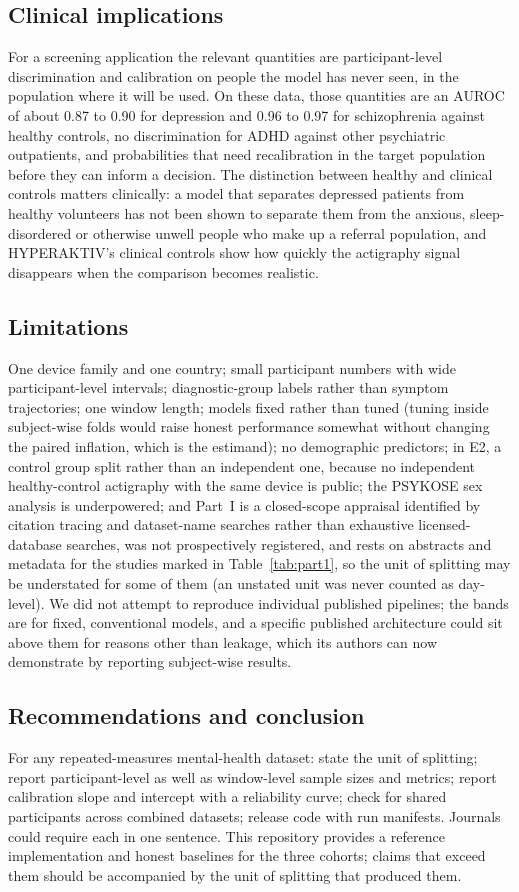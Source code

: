 \documentclass[11pt,a4paper]{article}
\begin{document}
\subsection{Clinical implications}
For a screening application the relevant quantities are participant-level discrimination and
calibration on people the model has never seen, in the population where it will be used. On
these data, those quantities are an AUROC of about 0.87 to 0.90 for depression and 0.96 to 0.97
for schizophrenia against healthy controls, no discrimination for ADHD against other psychiatric
outpatients, and probabilities that need recalibration in the target population before they can
inform a decision. The distinction between healthy and clinical controls matters clinically: a
model that separates depressed patients from healthy volunteers has not been shown to separate
them from the anxious, sleep-disordered or otherwise unwell people who make up a referral
population, and HYPERAKTIV's clinical controls show how quickly the actigraphy signal disappears
when the comparison becomes realistic.

\subsection{Limitations}
One device family and one country; small participant numbers with wide participant-level
intervals; diagnostic-group labels rather than symptom trajectories; one window length; models
fixed rather than tuned (tuning inside subject-wise folds would raise honest performance
somewhat without changing the paired inflation, which is the estimand); no demographic
predictors; in E2, a control group split rather than an independent one, because no independent
healthy-control actigraphy with the same device is public; the PSYKOSE sex analysis is
underpowered; and Part~I is a closed-scope appraisal identified by citation tracing and
dataset-name searches rather than exhaustive licensed-database searches, was not prospectively
registered, and rests on abstracts and metadata for the studies marked in Table~\ref{tab:part1},
so the unit of splitting may be understated for some of them (an unstated unit was never counted
as day-level). We did not
attempt to reproduce individual published pipelines; the bands are for fixed, conventional
models, and a specific published architecture could sit above them for reasons other than
leakage, which its authors can now demonstrate by reporting subject-wise results.

\subsection{Recommendations and conclusion}
For any repeated-measures mental-health dataset: state the unit of splitting; report
participant-level as well as window-level sample sizes and metrics; report calibration slope and
intercept with a reliability curve; check for shared participants across combined datasets;
release code with run manifests. Journals could require each in one sentence. This repository
provides a reference implementation and honest baselines for the three cohorts; claims that
exceed them should be accompanied by the unit of splitting that produced them.
\end{document}
